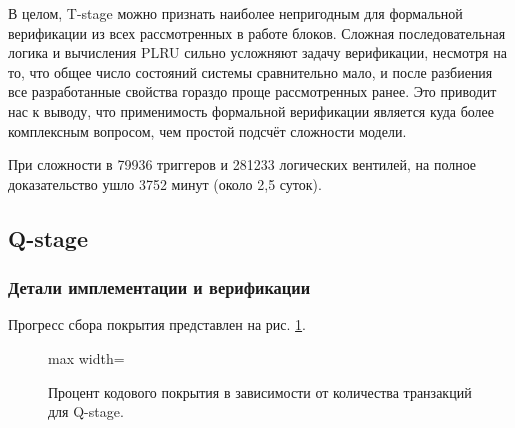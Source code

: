 В целом, T-stage можно признать наиболее непригодным для формальной верификации из всех рассмотренных в работе блоков. Сложная последовательная логика и вычисления PLRU сильно усложняют задачу верификации, несмотря на то, что общее число состояний системы сравнительно мало, и после разбиения все разработанные свойства гораздо проще рассмотренных ранее. Это приводит нас к выводу, что применимость формальной верификации является куда более комплексным вопросом, чем простой подсчёт сложности модели. 

При сложности в 79936 триггеров и 281233 логических вентилей, на полное доказательство ушло 3752 минут (около 2,5 суток).

\subsection{Q-stage}

\subsubsection*{Детали имплементации и верификации}

\tab Прогресс сбора покрытия представлен на рис. \ref{fig:cov_q}.

\begin{figure}[h]
	\centering
		\begin{adjustbox}{max width=\textwidth}
		\end{adjustbox}
		\caption{Процент кодового покрытия в зависимости от количества транзакций для Q-stage.}
		\label{fig:cov_q}
\end{figure}

